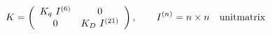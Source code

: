 \begin{equation}
K= \left(
\begin{array}{cc}
K_q~I^{(6)} & 0 \\
0 & K_D~I^{(21)}
\end{array} \right),~~~~~~I^{(n)}= n\times n ~~~{\rm unit matrix}
\end{equation}

